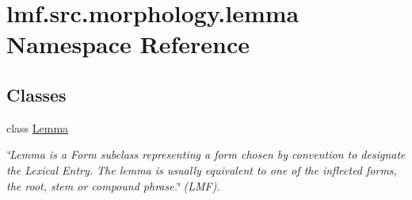 \hypertarget{namespacelmf_1_1src_1_1morphology_1_1lemma}{\section{lmf.\+src.\+morphology.\+lemma Namespace Reference}
\label{namespacelmf_1_1src_1_1morphology_1_1lemma}
}
\subsection*{Classes}
\begin{DoxyCompactItemize}
\item 
class \hyperlink{classlmf_1_1src_1_1morphology_1_1lemma_1_1_lemma}{Lemma}
\begin{DoxyCompactList}\small\item\em \char`\"{}\+Lemma is a Form subclass representing a form chosen by convention to designate the Lexical Entry. The lemma is usually equivalent to one of the inflected forms, the root, stem or compound phrase.\char`\"{} (L\+M\+F). \end{DoxyCompactList}\end{DoxyCompactItemize}
